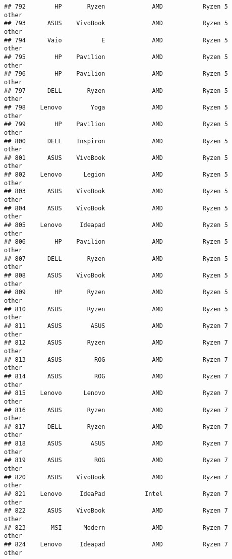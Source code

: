 \documentclass[
]{article}
\begin{document}
\begin{verbatim}
## 792        HP       Ryzen             AMD           Ryzen 5           other
## 793      ASUS    VivoBook             AMD           Ryzen 5           other
## 794      Vaio           E             AMD           Ryzen 5           other
## 795        HP    Pavilion             AMD           Ryzen 5           other
## 796        HP    Pavilion             AMD           Ryzen 5           other
## 797      DELL       Ryzen             AMD           Ryzen 5           other
## 798    Lenovo        Yoga             AMD           Ryzen 5           other
## 799        HP    Pavilion             AMD           Ryzen 5           other
## 800      DELL    Inspiron             AMD           Ryzen 5           other
## 801      ASUS    VivoBook             AMD           Ryzen 5           other
## 802    Lenovo      Legion             AMD           Ryzen 5           other
## 803      ASUS    VivoBook             AMD           Ryzen 5           other
## 804      ASUS    VivoBook             AMD           Ryzen 5           other
## 805    Lenovo     Ideapad             AMD           Ryzen 5           other
## 806        HP    Pavilion             AMD           Ryzen 5           other
## 807      DELL       Ryzen             AMD           Ryzen 5           other
## 808      ASUS    VivoBook             AMD           Ryzen 5           other
## 809        HP       Ryzen             AMD           Ryzen 5           other
## 810      ASUS       Ryzen             AMD           Ryzen 5           other
## 811      ASUS        ASUS             AMD           Ryzen 7           other
## 812      ASUS       Ryzen             AMD           Ryzen 7           other
## 813      ASUS         ROG             AMD           Ryzen 7           other
## 814      ASUS         ROG             AMD           Ryzen 7           other
## 815    Lenovo      Lenovo             AMD           Ryzen 7           other
## 816      ASUS       Ryzen             AMD           Ryzen 7           other
## 817      DELL       Ryzen             AMD           Ryzen 7           other
## 818      ASUS        ASUS             AMD           Ryzen 7           other
## 819      ASUS         ROG             AMD           Ryzen 7           other
## 820      ASUS    VivoBook             AMD           Ryzen 7           other
## 821    Lenovo     IdeaPad           Intel           Ryzen 7           other
## 822      ASUS    VivoBook             AMD           Ryzen 7           other
## 823       MSI      Modern             AMD           Ryzen 7           other
## 824    Lenovo     Ideapad             AMD           Ryzen 7           other

\end{verbatim}
\end{document}
